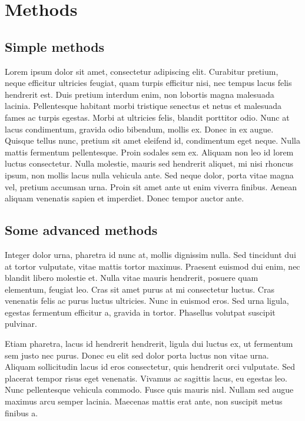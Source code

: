 \section{Methods}

\subsection{Simple methods}
Lorem ipsum dolor sit amet, consectetur adipiscing elit. Curabitur pretium, neque efficitur ultricies feugiat, quam turpis efficitur nisi, nec tempus lacus felis hendrerit est. Duis pretium interdum enim, non lobortis magna malesuada lacinia. Pellentesque habitant morbi tristique senectus et netus et malesuada fames ac turpis egestas. Morbi at ultricies felis, blandit porttitor odio. Nunc at lacus condimentum, gravida odio bibendum, mollis ex. Donec in ex augue. Quisque tellus nunc, pretium sit amet eleifend id, condimentum eget neque. Nulla mattis fermentum pellentesque. Proin sodales sem ex. Aliquam non leo id lorem luctus consectetur. Nulla molestie, mauris sed hendrerit aliquet, mi nisi rhoncus ipsum, non mollis lacus nulla vehicula ante. Sed neque dolor, porta vitae magna vel, pretium accumsan urna. Proin sit amet ante ut enim viverra finibus. Aenean aliquam venenatis sapien et imperdiet. Donec tempor auctor ante.


\subsection{Some advanced methods}
Integer dolor urna, pharetra id nunc at, mollis dignissim nulla. Sed tincidunt dui at tortor vulputate, vitae mattis tortor maximus. Praesent euismod dui enim, nec blandit libero molestie et. Nulla vitae mauris hendrerit, posuere quam elementum, feugiat leo. Cras sit amet purus at mi consectetur luctus. Cras venenatis felis ac purus luctus ultricies. Nunc in euismod eros. Sed urna ligula, egestas fermentum efficitur a, gravida in tortor. Phasellus volutpat suscipit pulvinar.

Etiam pharetra, lacus id hendrerit hendrerit, ligula dui luctus ex, ut fermentum sem justo nec purus. Donec eu elit sed dolor porta luctus non vitae urna. Aliquam sollicitudin lacus id eros consectetur, quis hendrerit orci vulputate. Sed placerat tempor risus eget venenatis. Vivamus ac sagittis lacus, eu egestas leo. Nunc pellentesque vehicula commodo. Fusce quis mauris nisl. Nullam sed augue maximus arcu semper lacinia. Maecenas mattis erat ante, non suscipit metus finibus a. 